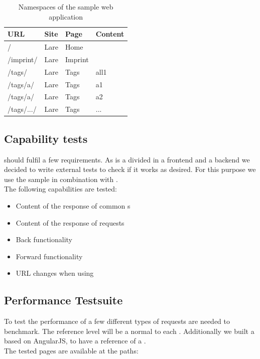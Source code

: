 \begin{table}[h]
\centering
\begin{tabular}{llll}
	\hline
	\textbf{URL} & \textbf{Site} & \textbf{Page} & \textbf{Content} \\
	\hline
	/ & Lare & Home &  \\
	/imprint/ & Lare & Imprint &  \\
	/tags/ & Lare & Tags & all1 \\
	/tags/a/ & Lare & Tags & a1 \\
	/tags/a/ & Lare & Tags & a2 \\
	/tags/.../ & Lare & Tags & ... \\
	\hline
\end{tabular}
\caption{Namespaces of the sample web application}
\label{tab:sampleapp_namespaces}
\end{table}


\subsection{Capability tests\label{browser_functionality_tests}}

\lare{} should fulfil a few requirements.
As \lare{} is a divided in a frontend and a backend we decided to write external tests to check if it works as desired.
For this purpose we use the sample \webApplication{} in combination with \selenium{}.
\\
The following capabilities are tested:
\begin{itemize}
\item Content of the response of common \httpRequest{}s
\item Content of the response of \lare{} requests
\item Back functionality
\item Forward functionality
\item URL changes when using \lare{}
\end{itemize}


\subsection{Performance Testsuite\label{testsuite}}

To test the performance of \lare{} a few different types of requests are needed to benchmark.
The reference level will be a normal \httpRequest{} to each \webPage{}.
Additionally we built a \webApplication{} based on AngularJS, to have a reference of a \clientSideMVC{}.
\\
The tested pages are available at the paths:

